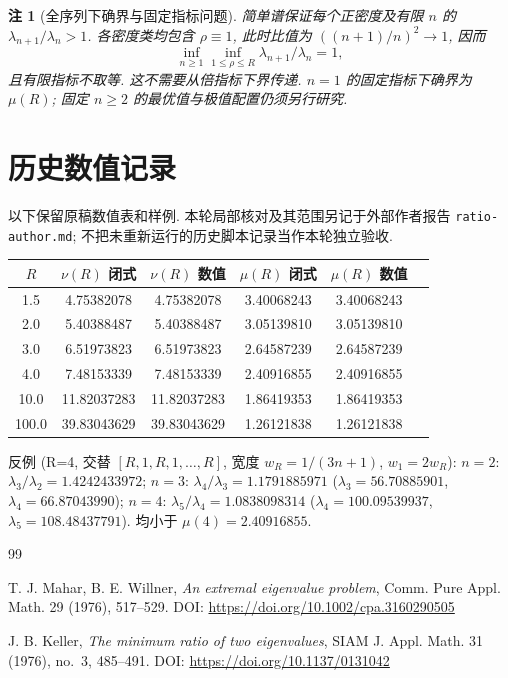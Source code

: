 \documentclass[UTF8]{ctexart}
\newtheorem{remark}[theorem]{注}
\begin{document}
\begin{remark}[全序列下确界与固定指标问题]
简单谱保证每个正密度及有限 $n$ 的 $\lambda_{n+1}/\lambda_n>1$.
各密度类均包含 $\rho\equiv1$, 此时比值为
$((n+1)/n)^2\to1$, 因而
\[
 \inf_{n\ge1}\inf_{1\le\rho\le R}\lambda_{n+1}/\lambda_n=1,
\]
且有限指标不取等. 这不需要从倍指标下界传递.
$n=1$ 的固定指标下确界为 $\mu(R)$;
固定 $n\ge2$ 的最优值与极值配置仍须另行研究.
\end{remark}

\section{历史数值记录}

以下保留原稿数值表和样例. 本轮局部核对及其范围另记于外部作者报告
\texttt{ratio-author.md}; 不把未重新运行的历史脚本记录当作本轮独立验收.

\begin{center}
\begin{tabular}{cccccc}
	\toprule
	$R$ & $\nu(R)$ 闭式 & $\nu(R)$ 数值 & $\mu(R)$ 闭式 & $\mu(R)$ 数值 \\
	\midrule
	1.5 & 4.75382078 & 4.75382078 & 3.40068243 & 3.40068243 \\
	2.0 & 5.40388487 & 5.40388487 & 3.05139810 & 3.05139810 \\
	3.0 & 6.51973823 & 6.51973823 & 2.64587239 & 2.64587239 \\
	4.0 & 7.48153339 & 7.48153339 & 2.40916855 & 2.40916855 \\
	10.0 & 11.82037283 & 11.82037283 & 1.86419353 & 1.86419353 \\
	100.0 & 39.83043629 & 39.83043629 & 1.26121838 & 1.26121838 \\
	\bottomrule
\end{tabular}
\end{center}

反例 (R=4, 交替 $[R,1,R,1,\dots,R]$, 宽度 $w_R = 1/(3n+1)$, $w_1 = 2w_R$):
$n=2$: $\lambda_3/\lambda_2 = 1.4242433972$; $n=3$: $\lambda_4/\lambda_3 = 1.1791885971$
($\lambda_3 = 56.70885901$, $\lambda_4 = 66.87043990$);
$n=4$: $\lambda_5/\lambda_4 = 1.0838098314$
($\lambda_4 = 100.09539937$, $\lambda_5 = 108.48437791$). 均小于 $\mu(4) = 2.40916855$.

\begin{thebibliography}{99}

 T. J. Mahar, B. E. Willner, \emph{An extremal eigenvalue problem},
	Comm. Pure Appl. Math. 29 (1976), 517--529.
	DOI: \url{https://doi.org/10.1002/cpa.3160290505}

 J. B. Keller, \emph{The minimum ratio of two eigenvalues},
	SIAM J. Appl. Math. 31 (1976), no.~3, 485--491.
	DOI: \url{https://doi.org/10.1137/0131042}

\end{thebibliography}
\end{document}
